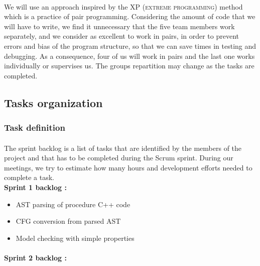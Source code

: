 \documentclass{report}
\begin{document}
\paragraph{}
\hspace{4mm}\textnormal{We will use an approach inspired by the XP (\textsc{extreme programming})
 method which is a practice of pair programming. Considering the amount of 
code that we will have to write,
 we find it unnecessary that the five team members work separately,
 and we consider as excellent to work in pairs, in order to prevent 
errors and bias of the program structure, so that we can save times
 in testing and debugging. As a consequence, four of us will work
 in pairs and the last one works individually or supervises us. The groups repartition 
may change as the tasks are completed.}

\subsection{Tasks organization}

\subsubsection{Task definition}

\paragraph{}
\hspace{4mm}\textnormal{The sprint backlog is a list of tasks that are identified by the members
 of the project and that has to be completed during the Scrum sprint.
During our meetings, we try to estimate how many hours and
development efforts needed to complete a task.
\\
\textbf{Sprint 1 backlog :}}

\vspace{3mm}
\begin{itemize}
\item AST parsing of procedure C++ code\vspace{1mm}
\item CFG conversion from parsed AST\vspace{1mm}
\item Model checking with simple properties\vspace{1mm}
\end{itemize}

\paragraph{}
\hspace{4mm}\textnormal{\textbf{Sprint 2 backlog :}}
\end{document}
